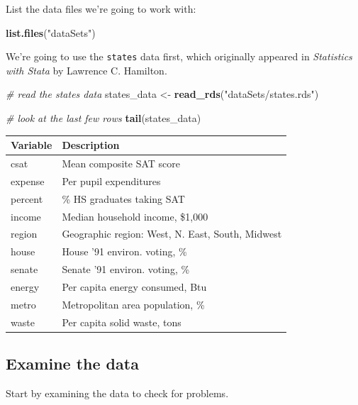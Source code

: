 \documentclass[]{book}
\newenvironment{Shaded}{\begin{snugshade}}{\end{snugshade}}
\newcommand{\KeywordTok}[1]{\textcolor[rgb]{0.13,0.29,0.53}{\textbf{#1}}}
\newcommand{\DataTypeTok}[1]{\textcolor[rgb]{0.13,0.29,0.53}{#1}}
\newcommand{\StringTok}[1]{\textcolor[rgb]{0.31,0.60,0.02}{#1}}
\newcommand{\CommentTok}[1]{\textcolor[rgb]{0.56,0.35,0.01}{\textit{#1}}}
\newcommand{\OperatorTok}[1]{\textcolor[rgb]{0.81,0.36,0.00}{\textbf{#1}}}
\newcommand{\NormalTok}[1]{#1}
\begin{document}
List the data files we're going to work with:

\begin{Shaded}
\begin{Highlighting}[]
\KeywordTok{list.files}\NormalTok{(}\StringTok{"dataSets"}\NormalTok{)}
\end{Highlighting}
\end{Shaded}

We're going to use the \texttt{states} data first, which originally
appeared in \emph{Statistics with Stata} by Lawrence C. Hamilton.

\begin{Shaded}
\begin{Highlighting}[]
  \CommentTok{# read the states data}
\NormalTok{  states_data <-}\StringTok{ }\KeywordTok{read_rds}\NormalTok{(}\StringTok{"dataSets/states.rds"}\NormalTok{) }

  \CommentTok{# look at the last few rows}
  \KeywordTok{tail}\NormalTok{(states_data)}
\end{Highlighting}
\end{Shaded}

\begin{longtable}[]{@{}ll@{}}
\toprule
Variable & Description\tabularnewline
\midrule
\endhead
csat & Mean composite SAT score\tabularnewline
expense & Per pupil expenditures\tabularnewline
percent & \% HS graduates taking SAT\tabularnewline
income & Median household income, \$1,000\tabularnewline
region & Geographic region: West, N. East, South, Midwest\tabularnewline
house & House '91 environ. voting, \%\tabularnewline
senate & Senate '91 environ. voting, \%\tabularnewline
energy & Per capita energy consumed, Btu\tabularnewline
metro & Metropolitan area population, \%\tabularnewline
waste & Per capita solid waste, tons\tabularnewline
\bottomrule
\end{longtable}

\subsection{Examine the data}\label{examine-the-data}

Start by examining the data to check for problems.

\begin{Shaded}
\end{Shaded}
\end{document}
